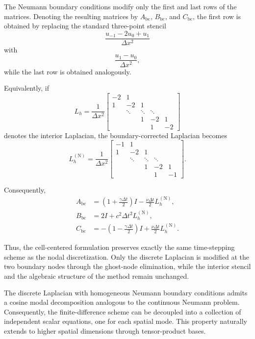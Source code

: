 \documentclass{Configuration_Files/PoliMi3i_thesis}
\begin{document}
The Neumann boundary conditions modify only the first and last rows of the matrices. Denoting the resulting matrices by
$A_{\mathrm{bc}}$, $B_{\mathrm{bc}}$, and $C_{\mathrm{bc}}$, the first row is obtained by replacing the standard three-point stencil
\begin{equation*}
\frac{
u_{-1}-2u_0+u_1
}{\Delta x^2}
\end{equation*}
with
\begin{equation*}
\frac{
u_1-u_0
}{\Delta x^2},
\end{equation*}
while the last row is obtained analogously.

Equivalently, if
\[
L_h
=
\frac1{\Delta x^2}
\begin{bmatrix}
-2 & 1  \\
1  & -2 & 1 \\
   & \ddots & \ddots & \ddots\\
   &&1&-2&1\\
   &&&1&-2
\end{bmatrix}
\]
denotes the interior Laplacian, the boundary-corrected Laplacian becomes
\begin{equation} \label{eq:boundary_corrected_laplacian}
L_h^{(\mathrm N)}
=
\frac1{\Delta x^2}
\begin{bmatrix}
-1 & 1 \\
1 & -2 & 1 \\
&\ddots&\ddots&\ddots\\
&&1&-2&1\\
&&&1&-1
\end{bmatrix}.
\end{equation}

Consequently,
\begin{align*}
A_{\mathrm{bc}}
&=
\left(1+\frac{\gamma\Delta t}{2}\right)I
-
\frac{\nu\Delta t}{2}
L_h^{(\mathrm N)},
\\
B_{\mathrm{bc}}
&=
2I
+
c^2\Delta t^2
L_h^{(\mathrm N)},
\\
C_{\mathrm{bc}}
&=
-\left(1-\frac{\gamma\Delta t}{2}\right)I
+
\frac{\nu\Delta t}{2}
L_h^{(\mathrm N)}.
\end{align*}

Thus, the cell-centered formulation preserves exactly the same time-stepping scheme as the nodal discretization. Only the discrete Laplacian is modified at the two boundary nodes through the ghost-node elimination, while the interior stencil and the algebraic structure of the method remain unchanged.

The discrete Laplacian with homogeneous Neumann boundary conditions admits a cosine modal decomposition analogous to the continuous Neumann problem. Consequently, the finite-difference scheme can be decoupled into a collection of independent scalar equations, one for each spatial mode. This property naturally extends to higher spatial dimensions through tensor-product bases.
\end{document}
